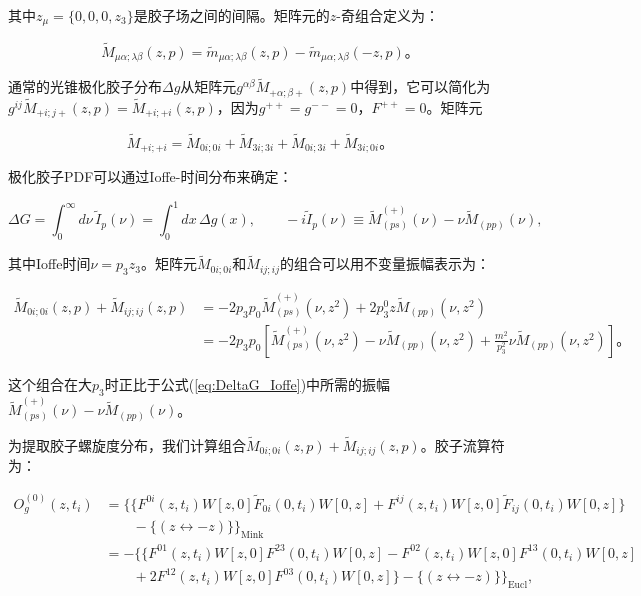 \documentclass[12pt,a4paper]{ctexart}
\theoremstyle{definition}
\begin{document}
其中$z_\mu = \{0, 0, 0, z_3\}$是胶子场之间的间隔。矩阵元的$z$-奇组合\cite{Egerer2022}定义为：

\begin{equation}
\tilde{M}_{\mu\alpha;\lambda\beta}(z,p) = \tilde{m}_{\mu\alpha;\lambda\beta}(z,p) - \tilde{m}_{\mu\alpha;\lambda\beta}(-z,p)。
\label{eq:z_odd}
\end{equation}

通常的光锥极化胶子分布$\Delta g$从矩阵元$g^{\alpha\beta} \tilde{M}_{+\alpha;\beta+}(z,p)$中得到，它可以简化为$g^{ij} \tilde{M}_{+i;j+}(z,p) = \tilde{M}_{+i;+i}(z,p)$，因为$g^{++} = g^{--} = 0$，$F^{++} = 0$。矩阵元

\begin{equation}
\tilde{M}_{+i;+i} = \tilde{M}_{0i;0i} + \tilde{M}_{3i;3i} + \tilde{M}_{0i;3i} + \tilde{M}_{3i;0i}。
\label{eq:M_plus}
\end{equation}

极化胶子PDF可以通过Ioffe-时间分布来确定\cite{Egerer2022}：

\begin{equation}
\Delta G = \int_0^\infty d\nu\, \tilde{I}_p(\nu) = \int_0^1 dx\, \Delta g(x), \qquad -i\tilde{I}_p(\nu) \equiv \tilde{M}_{(ps)}^{(+)}(\nu) - \nu \tilde{M}_{(pp)}(\nu),
\label{eq:DeltaG_Ioffe}
\end{equation}

其中Ioffe时间$\nu = p_3 z_3$。矩阵元$\tilde{M}_{0i;0i}$和$\tilde{M}_{ij;ij}$的组合可以用不变量振幅表示为：

\begin{equation}
\begin{aligned}
\tilde{M}_{0i;0i}(z,p) + \tilde{M}_{ij;ij}(z,p) &= -2p_3 p_0 \tilde{M}_{(ps)}^{(+)}(\nu, z^2) + 2p_3^0 z \tilde{M}_{(pp)}(\nu, z^2) \\
&= -2p_3 p_0 \left[ \tilde{M}_{(ps)}^{(+)}(\nu, z^2) - \nu \tilde{M}_{(pp)}(\nu, z^2) + \frac{m^2}{p_3^2} \nu \tilde{M}_{(pp)}(\nu, z^2) \right]。
\end{aligned}
\label{eq:helicity_decomp}
\end{equation}

这个组合在大$p_3$时正比于公式(\ref{eq:DeltaG_Ioffe})中所需的振幅$\tilde{M}_{(ps)}^{(+)}(\nu) - \nu \tilde{M}_{(pp)}(\nu)$。

为提取胶子螺旋度分布，我们计算组合$\tilde{M}_{0i;0i}(z,p) + \tilde{M}_{ij;ij}(z,p)$。胶子流算符为：

\begin{equation}
\begin{aligned}
O^{(0)}_g(z, t_i) &= \Big\{ \{F^{0i}(z,t_i)W[z,0]\tilde{F}_{0i}(0,t_i)W[0,z] + F^{ij}(z,t_i)W[z,0]\tilde{F}_{ij}(0,t_i)W[0,z]\} \\
&\qquad - \{ (z \leftrightarrow -z) \} \Big\}_{\text{Mink}} \\
&= -\Big\{ \{F^{01}(z,t_i)W[z,0]F^{23}(0,t_i)W[0,z] - F^{02}(z,t_i)W[z,0]F^{13}(0,t_i)W[0,z] \\
&\qquad + 2F^{12}(z,t_i)W[z,0]F^{03}(0,t_i)W[0,z]\} - \{ (z \leftrightarrow -z) \} \Big\}_{\text{Eucl}},
\end{aligned}
\label{eq:helicity_operator}
\end{equation}
\end{document}
